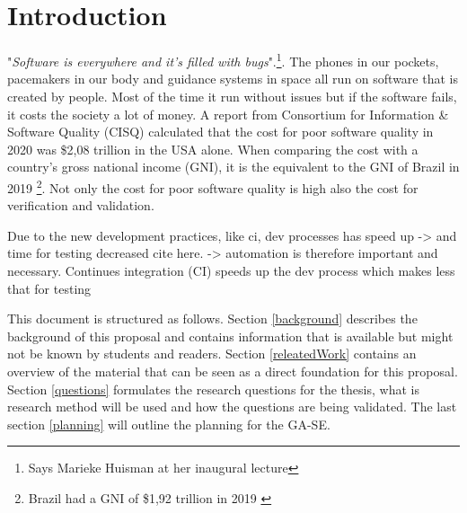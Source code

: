 \section{Introduction}
"\textit{Software is everywhere and it’s filled with bugs}".\cite{filledWithBugs}\footnote{Says Marieke Huisman at her inaugural lecture\cite{filledWithBugs}}. The phones in our pockets, pacemakers in our body and guidance systems in space all run on software that is created by people. Most of the time it run without issues but if the software fails, it costs the society a lot of money. A report from Consortium for Information \& Software Quality (CISQ) \cite{herb2020cost} calculated that the cost for poor software quality in 2020 was \$2,08 trillion in the USA alone. When comparing the cost with a country's gross national income (GNI), it is the equivalent to the GNI of Brazil in 2019 \cite{worldbank}\footnote{Brazil had a GNI of \$1,92 trillion in 2019 \cite{worldbank}}. Not only the cost for poor software quality is high also the cost for verification and validation. 


Due to the new development practices, like \acrfull{ci}, dev processes has speed up -> and time for testing decreased cite here. -> automation is therefore important and necessary. Continues integration (CI) speeds up the dev process which makes less that for testing

This document is structured as follows. Section \ref{background} describes the background of this proposal and contains information that is available but might not be known by students and readers. Section \ref{releatedWork} contains an overview of the material that can be seen as a direct foundation for this proposal. Section \ref{questions} formulates the research questions for the thesis, what is research method will be used and how the questions are being validated. The last section \ref{planning} will outline the planning for the GA-SE.